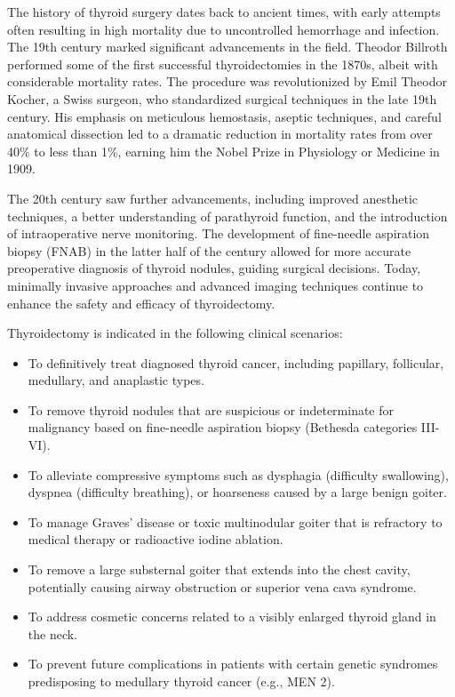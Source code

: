 The history of thyroid surgery dates back to ancient times, with early attempts often resulting in high mortality due to uncontrolled hemorrhage and infection. The 19th century marked significant advancements in the field. Theodor Billroth performed some of the first successful thyroidectomies in the 1870s, albeit with considerable mortality rates. The procedure was revolutionized by Emil Theodor Kocher, a Swiss surgeon, who standardized surgical techniques in the late 19th century. His emphasis on meticulous hemostasis, aseptic techniques, and careful anatomical dissection led to a dramatic reduction in mortality rates from over 40\% to less than 1\%, earning him the Nobel Prize in Physiology or Medicine in 1909.

The 20th century saw further advancements, including improved anesthetic techniques, a better understanding of parathyroid function, and the introduction of intraoperative nerve monitoring. The development of fine-needle aspiration biopsy (FNAB) in the latter half of the century allowed for more accurate preoperative diagnosis of thyroid nodules, guiding surgical decisions. Today, minimally invasive approaches and advanced imaging techniques continue to enhance the safety and efficacy of thyroidectomy.

Thyroidectomy is indicated in the following clinical scenarios:

\begin{itemize}
  \item To definitively treat diagnosed thyroid cancer, including papillary, follicular, medullary, and anaplastic types.
  \item To remove thyroid nodules that are suspicious or indeterminate for malignancy based on fine-needle aspiration biopsy (Bethesda categories III-VI).
  \item To alleviate compressive symptoms such as dysphagia (difficulty swallowing), dyspnea (difficulty breathing), or hoarseness caused by a large benign goiter.
  \item To manage Graves' disease or toxic multinodular goiter that is refractory to medical therapy or radioactive iodine ablation.
  \item To remove a large substernal goiter that extends into the chest cavity, potentially causing airway obstruction or superior vena cava syndrome.
  \item To address cosmetic concerns related to a visibly enlarged thyroid gland in the neck.
  \item To prevent future complications in patients with certain genetic syndromes predisposing to medullary thyroid cancer (e.g., MEN 2).
\end{itemize}

